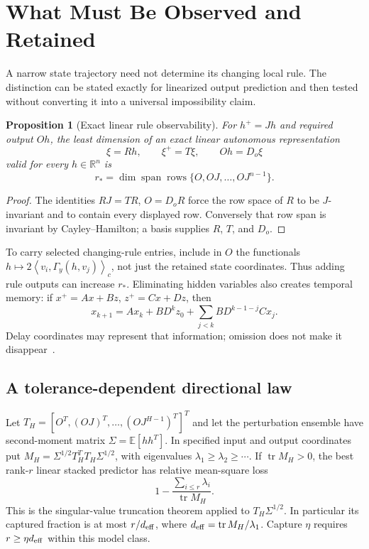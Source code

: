 \documentclass[journal]{IEEEtran}
\newtheorem{proposition}[theorem]{Proposition}
\theoremstyle{definition}
\newcommand{\R}{\mathbb{R}}
\newcommand{\ip}[2]{\left\langle#1,#2\right\rangle}
\DeclareMathOperator{\spanop}{span}
\DeclareMathOperator{\tr}{tr}
\begin{document}
\section{What Must Be Observed and Retained}
\label{sec:observability}
A narrow state trajectory need not determine its changing local rule.
The distinction can be stated exactly for linearized output prediction
and then tested without converting it into a universal impossibility claim.

\begin{proposition}[Exact linear rule observability]\label{prop:observability}
For $h^+=Jh$ and required output $Oh$, the least dimension of an exact
linear autonomous representation
\[
 \xi=Rh,\qquad \xi^+=T\xi,\qquad Oh=D_o\xi
\]
valid for every $h\in\R^n$ is
\begin{equation}
 r_* = \dim\spanop\operatorname{rows}
           \{O,OJ,\ldots,OJ^{n-1}\}.\label{eq:obsrank}
\end{equation}
\end{proposition}
\begin{proof}
The identities $RJ=TR$, $O=D_oR$ force the row space of $R$ to be
$J$-invariant and to contain every displayed row. Conversely that row span
is invariant by Cayley--Hamilton; a basis supplies $R$, $T$, and $D_o$.
\end{proof}
To carry selected changing-rule entries, include in $O$ the functionals
$h\mapsto2\ip{v_i}{\Gamma_y(h,v_j)}_c$, not just the retained state coordinates.
Thus adding rule outputs can increase $r_*$. Eliminating hidden variables
also creates temporal memory: if $x^+=Ax+Bz$, $z^+=Cx+Dz$, then
\[
 x_{k+1}=Ax_k+BD^kz_0+
       \sum_{j<k}BD^{k-1-j}Cx_j.
\]
Delay coordinates may represent that information; omission does not make it
disappear~\cite{linlu,kamb}.

\subsection{A tolerance-dependent directional law}
Let $T_H=[O^T,(OJ)^T,\ldots,(OJ^{H-1})^T]^T$ and let the perturbation ensemble have
second-moment matrix $\Sigma=\mathbb E[hh^T]$. In specified input and output coordinates put
$M_H=\Sigma^{1/2}T_H^TT_H\Sigma^{1/2}$, with eigenvalues
$\lambda_1\geq\lambda_2\geq\cdots$. If $\tr M_H>0$, the best rank-$r$
linear stacked predictor has relative mean-square loss
\begin{equation}
 1-\frac{\sum_{i\leq r}\lambda_i}{\tr M_H}.
 \label{eq:directionlaw}
\end{equation}
This is the singular-value truncation theorem applied to $T_H\Sigma^{1/2}$.
In particular its captured fraction is at most $r/d_{\rm eff}$, where
$d_{\rm eff}=\tr M_H/\lambda_1$. Capture $\eta$ requires
$r\geq\eta d_{\rm eff}$ within this model class.
\end{document}
